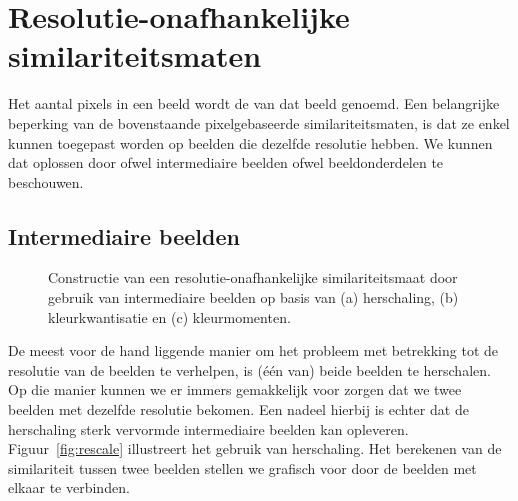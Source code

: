 


\section{Resolutie-onafhankelijke similariteitsmaten}
\label{sectie:res-onafh}

Het aantal pixels in een beeld wordt de  van dat beeld genoemd.
Een belangrijke beperking van de bovenstaande pixelgebaseerde similariteitsmaten, is dat
ze enkel kunnen toegepast worden op beelden die dezelfde resolutie hebben.
We kunnen dat oplossen door ofwel intermediaire beelden ofwel beeldonderdelen te beschouwen.

\subsection{Intermediaire beelden}

\begin{figure}[bp]
\vspace{10pt}
\centering
{}
\qquad
{}
\qquad
{}
\caption{\label{fig:intermediaire_beelden}Constructie van een resolutie-onafhankelijke 
similariteitsmaat door gebruik van intermediaire beelden op basis van (a) herschaling, 
(b) kleurkwantisatie en (c) kleurmomenten.}
\end{figure}

De meest voor de hand liggende manier om het probleem met betrekking tot de resolutie van de beelden
te verhelpen, is (\'e\'en van) beide beelden te herschalen. Op die manier kunnen we er immers gemakkelijk 
voor zorgen dat we twee beelden met dezelfde resolutie bekomen. Een nadeel hierbij is echter dat de
herschaling sterk vervormde intermediaire beelden kan opleveren. Figuur~\ref{fig:rescale} illustreert
het gebruik van herschaling. Het berekenen van de similariteit tussen twee beelden stellen we grafisch
voor door de beelden met elkaar te verbinden. 


